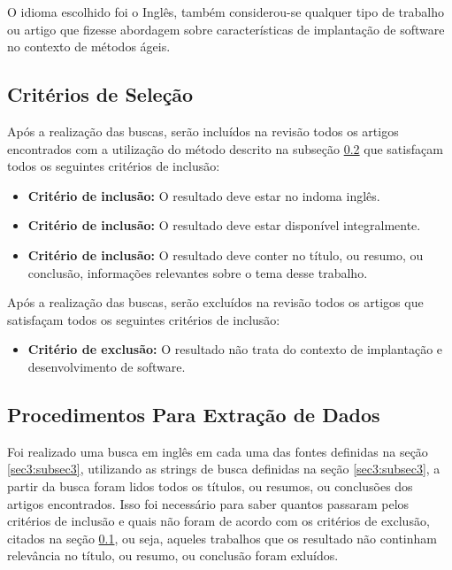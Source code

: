 \documentclass[12pt]{article}
\begin{document}
O idioma escolhido foi o Inglês, também considerou-se qualquer tipo de trabalho ou artigo que fizesse abordagem sobre características de implantação de software no contexto de métodos ágeis.


\subsection{Critérios de Seleção} \label{sec3:subsec4}

Após a realização das buscas, serão incluídos na revisão todos os artigos encontrados com a utilização do método descrito na subseção \ref{sec3:subsec5} que satisfaçam todos os seguintes critérios de inclusão:

 \begin{itemize}
   \item  \textbf{Critério de inclusão:} O resultado deve estar no indoma inglês.
   \item  \textbf{Critério de inclusão:}  O resultado deve estar disponível integralmente.
   \item  \textbf{Critério de inclusão:}   O resultado deve conter no título, ou resumo, ou conclusão,  informações relevantes sobre o tema desse trabalho.
 \end{itemize}

 Após a realização das buscas, serão excluídos na revisão todos os artigos que satisfaçam todos os seguintes critérios de inclusão:

 \begin{itemize}
   \item  \textbf{Critério de exclusão:} O resultado não trata do contexto de implantação e desenvolvimento de software.
 \end{itemize}

\subsection{Procedimentos Para Extração de Dados} \label{sec3:subsec5}

Foi realizado uma busca em inglês em cada uma das fontes definidas na seção \ref{sec3:subsec3}, utilizando as strings de busca definidas na seção \ref{sec3:subsec3}, a partir da busca foram lidos todos os títulos, ou resumos, ou conclusões dos artigos encontrados. Isso foi necessário para saber quantos passaram pelos critérios de inclusão e quais não foram de acordo com os critérios de exclusão, citados na seção \ref{sec3:subsec4}, ou seja, aqueles trabalhos que os resultado não continham relevância no título, ou resumo, ou conclusão foram exluídos.
\end{document}
